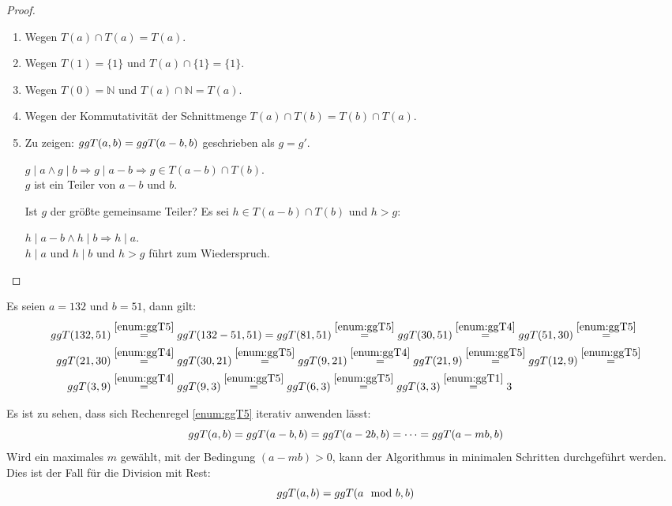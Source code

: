 \begin{proof}\mbox{}
  \begin{enumerate}
    \item Wegen $T(a) \cap T(a) = T(a)$.
    \item Wegen $T(1) = \{1\}$ und $T(a) \cap \{1\} = \{1\}$.
    \item Wegen $T(0) = \mathbb{N}$ und $T(a) \cap \mathbb{N} = T(a)$.
    \item Wegen der Kommutativität der Schnittmenge $T(a) \cap T(b) = T(b)\cap T(a)$.
    \item Zu zeigen: $ggT(a,b) = ggT(a - b,b)$ geschrieben als $g = g'$.
          \begin{center}
            $g \mid a \wedge g \mid b \Rightarrow g \mid a-b \Rightarrow g \in T(a-b) \cap T(b)$.\\
            $g$ ist ein Teiler von $a-b$ und $b$.
          \end{center}
          Ist $g$ der größte gemeinsame Teiler?
          Es sei $h \in T(a-b) \cap T(b)$ und $h > g$:
          \begin{center}
            $h \mid a-b \wedge h \mid b \Rightarrow h \mid a$.\\
            $h \mid a$ und $h \mid b$ und $h > g$ führt zum Wiederspruch.
          \end{center}
  \end{enumerate}
\end{proof}

\begin{example}
  Es seien $a=132$ und $b=51$, dann gilt:
  \begin{align*}
    ggT(132,51) & \stackrel{\ref{enum:ggT5}}{=} ggT(132 - 51,51) =
    ggT(81,51) \stackrel{\ref{enum:ggT5}}{=} ggT(30,51) \stackrel{\ref{enum:ggT4}}{=}
    ggT(51,30) \stackrel{\ref{enum:ggT5}}{=}                                          \\
    ggT(21,30)  & \stackrel{\ref{enum:ggT4}}{=}  ggT(30,21) \stackrel{\ref{enum:ggT5}}{=}
    ggT(9,21) \stackrel{\ref{enum:ggT4}}{=}
    ggT(21,9) \stackrel{\ref{enum:ggT5}}{=} ggT(12,9) \stackrel{\ref{enum:ggT5}}{=}       \\
    ggT(3,9)    & \stackrel{\ref{enum:ggT4}}{=} ggT(9,3) \stackrel{\ref{enum:ggT5}}{=}
    ggT(6,3) \stackrel{\ref{enum:ggT5}}{=} ggT(3,3) \stackrel{\ref{enum:ggT1}}{=} 3 \qedhere
  \end{align*}
\end{example}

\noindent
Es ist zu sehen, dass sich Rechenregel \ref{enum:ggT5} iterativ anwenden lässt:
\begin{equation*}
  ggT(a,b) = ggT(a-b,b) = ggT(a-2b,b) = \dots = ggT(a-mb,b)
\end{equation*}
Wird ein maximales $m$ gewählt, mit der Bedingung $(a-mb) > 0$, kann der Algorithmus
in minimalen Schritten durchgeführt werden. Dies ist der Fall für die Division mit Rest:
\begin{equation*}
  ggT(a,b) = ggT(a \mod{b},b)
\end{equation*}

